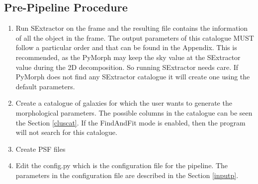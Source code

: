 \documentclass[a4paper,10pt]{article}
\begin{document}
\subsection{Pre-Pipeline Procedure}
\begin{enumerate}
 \item 
Run SExtractor on the frame and the resulting file contains the information of all the object in the frame. The output parameters of this catalogue MUST follow a particular order and that can be found in the Appendix. This is recommended, as the PyMorph may keep the sky value at the SExtractor value during the 2D decomposition. So running SExtractor needs care. If PyMorph does not find any SExtractor catalogue it will create one using the default parameters.
\item
Create a catalogue of galaxies for which the user wants to generate the morphological parameters. The possible columns in the catalogue can be seen the Section \ref{cluscat}. If the FindAndFit mode is enabled, then the program will not search for this catalogue.
\item
Create PSF files%
\item
Edit the config.py which is the configuration file for the pipeline. The parameters in the configuration file are described in the Section \ref{inputp}.
\end{enumerate}
\end{document}
